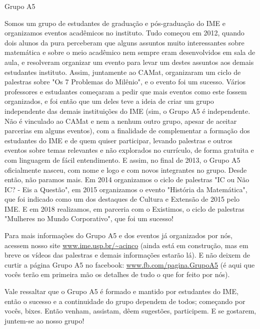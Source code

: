 \begin{subsecao}{Grupo A5}


Somos um grupo de estudantes de graduação e pós-graduação do IME e organizamos 
eventos acadêmicos no instituto. Tudo começou em 2012, quando dois alunos da 
pura perceberam que alguns assuntos muito interessantes sobre matemática 
e sobre o meio acadêmico nem sempre eram desenvolvidos em sala de
aula, e resolveram organizar um evento para levar um destes assuntos aos demais
estudantes instituto. Assim, juntamente ao CAMat, organizaram um ciclo de
palestras sobre "Os 7 Problemas do Milênio", e o evento foi um sucesso.  Vários
professores e estudantes começaram a pedir que mais eventos como este fossem
organizados, e foi então que um deles teve a ideia de criar um grupo
independente das demais instituições do IME (sim, o Grupo A5 é independente. Não
é vinculado ao CAMat e nem a nenhum outro grupo, apesar de aceitar parcerias em
alguns eventos), com a finalidade de complementar a formação dos estudantes do
IME e de quem quiser participar, levando palestras e outros eventos sobre temas
relevantes e não explorados no currículo, de forma gratuita e com linguagem de
fácil entendimento.  E assim, no final de 2013, o Grupo A5 oficialmente nasceu,
com nome e logo e com novos integrantes no grupo.  Desde então, não paramos
mais. Em 2014 organizamos o ciclo de palestras "IC ou Não IC? - Eis a Questão",
em 2015 organizamos o evento "História da Matemática", que foi indicado como um
dos destaques de Cultura e Extensão de 2015 pelo IME. E em 2018 realizamos, em 
parceria com o Existimos, o ciclo de palestras "Mulheres no Mundo Corporativo",
que foi um sucesso! 

Para mais informações do Grupo A5 e dos eventos já organizados por nós, acessem
nosso site \url{www.ime.usp.br/~acinco} (ainda está em construção, mas em breve os
vídeos das palestras e demais informações estarão lá). E não deixem de curtir
a página Grupo A5 no facebook: \url{www.fb.com/pagina.GrupoA5} (é aqui que
vocês terão em primeira mão os detalhes de tudo o que for feito por nós).

Vale ressaltar que o Grupo A5 é formado e mantido por estudantes do IME, então o
sucesso e a continuidade do grupo dependem de todos; começando por vocês,
bixes. Então venham, assistam, dêem sugestões, participem. E se gostarem,
juntem-se ao nosso grupo!

\end{subsecao}
